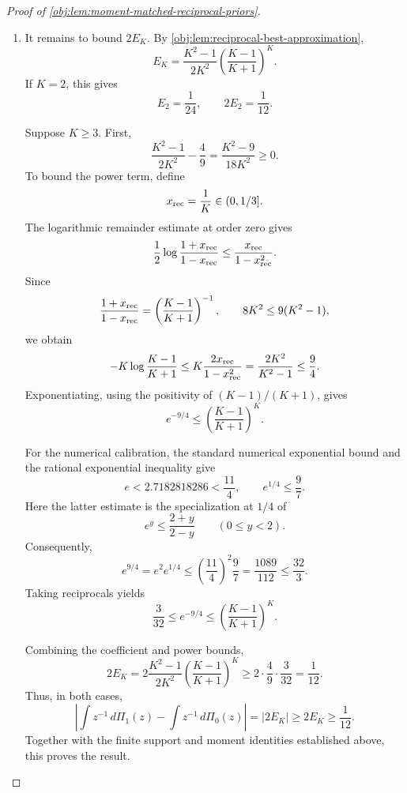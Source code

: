 \documentclass[11pt]{article}
\begin{document}
\begin{proof}[Proof of \cref{obj:lem:moment-matched-reciprocal-priors}]
\begin{enumerate}
For the reciprocal function, the orientation gives
\[
\int z^{-1}\,d\Pi_1(z)-\int z^{-1}\,d\Pi_0(z)
=
\begin{cases}
2d_\star,&d_\star\ge0,\\
-2d_\star,&d_\star<0
\end{cases}
=2|d_\star|=2E_K.
\]

\item It remains to bound \(2E_K\). By \cref{obj:lem:reciprocal-best-approximation},
\[
E_K=\frac{K^2-1}{2K^2}
\left(\frac{K-1}{K+1}\right)^K.
\]
If \(K=2\), this gives
\[
E_2=\frac1{24},
\qquad
2E_2=\frac1{12}.
\]

Suppose \(K\ge3\). First,
\[
\frac{K^2-1}{2K^2}-\frac49
=\frac{K^2-9}{18K^2}\ge0.
\]
To bound the power term, define
\[
x_{\rm rec}=\frac1K\in(0,1/3].
\]
The logarithmic remainder estimate at order zero gives
\[
\frac12\log\frac{1+x_{\rm rec}}{1-x_{\rm rec}}
\le\frac{x_{\rm rec}}{1-x_{\rm rec}^2}.
\]
Since
\[
\frac{1+x_{\rm rec}}{1-x_{\rm rec}}
=\left(\frac{K-1}{K+1}\right)^{-1},
\qquad
8K^2\le9(K^2-1),
\]
we obtain
\[
-K\log\frac{K-1}{K+1}
\le K\frac{2x_{\rm rec}}{1-x_{\rm rec}^2}
=\frac{2K^2}{K^2-1}
\le\frac94.
\]
Exponentiating, using the positivity of \((K-1)/(K+1)\), gives
\[
e^{-9/4}\le\left(\frac{K-1}{K+1}\right)^K.
\]

For the numerical calibration, the standard numerical exponential bound and the rational exponential inequality give
\[
e<2.7182818286<\frac{11}{4},
\qquad
e^{1/4}\le\frac97.
\]
Here the latter estimate is the specialization at \(1/4\) of
\[
e^y\le\frac{2+y}{2-y}\qquad(0\le y<2).
\]
Consequently,
\[
e^{9/4}=e^2e^{1/4}
\le\left(\frac{11}{4}\right)^2\frac97
=\frac{1089}{112}
\le\frac{32}{3}.
\]
Taking reciprocals yields
\[
\frac3{32}\le e^{-9/4}
\le\left(\frac{K-1}{K+1}\right)^K.
\]

Combining the coefficient and power bounds,
\[
2E_K
=2\frac{K^2-1}{2K^2}
 \left(\frac{K-1}{K+1}\right)^K
\ge2\cdot\frac49\cdot\frac3{32}
=\frac1{12}.
\]
Thus, in both cases,
\[
\left|\int z^{-1}\,d\Pi_1(z)-\int z^{-1}\,d\Pi_0(z)\right|
=|2E_K|
\ge2E_K
\ge\frac1{12}.
\]
Together with the finite support and moment identities established above, this proves the result.
\end{enumerate}
\end{proof}
\end{document}
